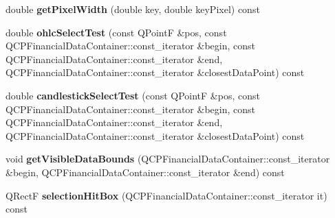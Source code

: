 \begin{DoxyCompactItemize}
\item 
double {\bfseries get\+Pixel\+Width} (double key, double key\+Pixel) const \hypertarget{class_q_c_p_financial_a86706190fc71b009b67a183f1f247729}{}\label{class_q_c_p_financial_a86706190fc71b009b67a183f1f247729}

\item 
double {\bfseries ohlc\+Select\+Test} (const Q\+PointF \&pos, const Q\+C\+P\+Financial\+Data\+Container\+::const\+\_\+iterator \&begin, const Q\+C\+P\+Financial\+Data\+Container\+::const\+\_\+iterator \&end, Q\+C\+P\+Financial\+Data\+Container\+::const\+\_\+iterator \&closest\+Data\+Point) const \hypertarget{class_q_c_p_financial_aea6f07a7140694a59e1a2a8477af2bdd}{}\label{class_q_c_p_financial_aea6f07a7140694a59e1a2a8477af2bdd}

\item 
double {\bfseries candlestick\+Select\+Test} (const Q\+PointF \&pos, const Q\+C\+P\+Financial\+Data\+Container\+::const\+\_\+iterator \&begin, const Q\+C\+P\+Financial\+Data\+Container\+::const\+\_\+iterator \&end, Q\+C\+P\+Financial\+Data\+Container\+::const\+\_\+iterator \&closest\+Data\+Point) const \hypertarget{class_q_c_p_financial_a34bf41e29ade0ea6840536279c10b58c}{}\label{class_q_c_p_financial_a34bf41e29ade0ea6840536279c10b58c}

\item 
void {\bfseries get\+Visible\+Data\+Bounds} (Q\+C\+P\+Financial\+Data\+Container\+::const\+\_\+iterator \&begin, Q\+C\+P\+Financial\+Data\+Container\+::const\+\_\+iterator \&end) const \hypertarget{class_q_c_p_financial_ad650d7fd0f498f6ca65460a031c37515}{}\label{class_q_c_p_financial_ad650d7fd0f498f6ca65460a031c37515}

\item 
Q\+RectF {\bfseries selection\+Hit\+Box} (Q\+C\+P\+Financial\+Data\+Container\+::const\+\_\+iterator it) const \hypertarget{class_q_c_p_financial_ae31f1142fadc67b2721698ec3153b7d5}{}\label{class_q_c_p_financial_ae31f1142fadc67b2721698ec3153b7d5}

\end{DoxyCompactItemize}
